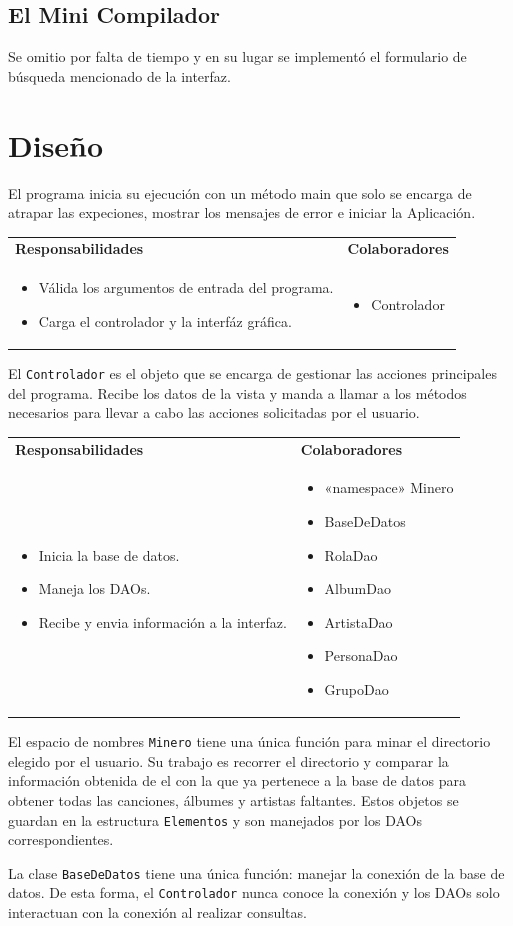 \documentclass[12pt]{article}  %
\makeatletter
\newcommand{\crc}[3]{
    \begin{center}
        \begin{tcolorbox}[
            colback=maincolor!10, colframe=maincolor,
            colupper=black, fontupper=\footnotesize\ttfamily,
            boxrule=0.2mm, arc=2pt,
            left=3pt, right=3pt, top=1pt, bottom=1pt,
            title={\fontseries{b}\selectfont\footnotesize Class
                \begin{center}
                    #1
                \end{center}},
            colbacktitle=maincolor!35,
            coltitle=black,
            toptitle=4pt, bottomtitle=4pt
            ]

            \begin{tabularx}{\linewidth}{@{}X|X@{}}
              \textbf{\footnotesize Responsabilidades}
              & \textbf{\footnotesize Colaboradores} \\[4pt]
              \begin{itemize}[itemsep=-5pt, leftmargin=*]
                  #2
              \end{itemize}
              &  \begin{itemize}[itemsep=-5pt, leftmargin=*]
                  #3
              \end{itemize}
            \end{tabularx}
        \end{tcolorbox}
    \end{center}
}
\makeatother
\begin{document}
\subsection{El Mini Compilador}

Se omitio por falta de tiempo y en su lugar se implementó el formulario de búsqueda
mencionado de la interfaz.

\section{Diseño}

El programa inicia su ejecución con un método main que solo se encarga de
atrapar las expeciones, mostrar los mensajes de error e iniciar la Aplicación.

\crc{Aplicacion}{
  \item Válida los argumentos de entrada del programa.
  \item Carga el controlador y la interfáz gráfica.
}{
  \item Controlador
}

El \texttt{Controlador} es el objeto que se encarga de gestionar las acciones
principales del programa. Recibe los datos de la vista y manda a llamar a los
métodos necesarios para llevar a cabo las acciones solicitadas por el usuario.

\crc{Controlador}{
  \item Inicia la base de datos.
  \item Maneja los DAOs.
  \item Recibe y envia información a la interfaz.
}{
  \item «namespace» Minero
  \item BaseDeDatos
  \item RolaDao
  \item AlbumDao
  \item ArtistaDao
  \item PersonaDao
  \item GrupoDao
}

El espacio de nombres \texttt{Minero} tiene una única función para minar el
directorio elegido por el usuario. Su trabajo es recorrer el directorio y
comparar la información obtenida de el con la que ya pertenece a la base de
datos para obtener todas las canciones, álbumes y artistas faltantes. Estos
objetos se guardan en la estructura \texttt{Elementos} y son manejados por los
DAOs correspondientes.

La clase \texttt{BaseDeDatos} tiene una única función: manejar la conexión de la
base de datos. De esta forma, el \texttt{Controlador} nunca conoce la conexión y
los DAOs solo interactuan con la conexión al realizar consultas.
\end{document}
